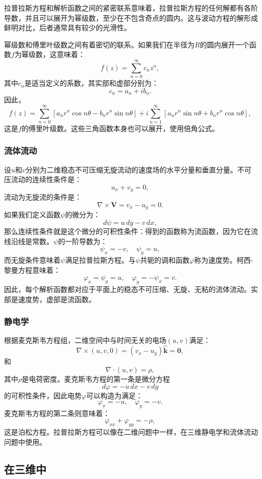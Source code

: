 拉普拉斯方程和解析函数之间的紧密联系意味着，拉普拉斯方程的任何解都有各阶导数，并且可以展开为幂级数，至少在不包含奇点的圆内。这与波动方程的解形成鲜明对比，后者通常具有较少的光滑性。

幂级数和傅里叶级数之间有着密切的联系。如果我们在半径为\( R \)的圆内展开一个函数\( f \)为幂级数，这意味着：
\[
f(z) = \sum_{n=0}^{\infty} c_n z^n,~
\]
其中\( c_n \)是适当定义的系数，其实部和虚部分别为：
\[
c_n = a_n + i b_n.~
\]
因此，
\[
f(z) = \sum_{n=0}^{\infty} \left[ a_n r^n \cos n\theta - b_n r^n \sin n\theta \right] + i \sum_{n=1}^{\infty} \left[ a_n r^n \sin n\theta + b_n r^n \cos n\theta \right],~
\]
这是\( f \)的傅里叶级数。这些三角函数本身也可以展开，使用倍角公式。
\subsubsection{流体流动}   
设\( u \)和\( v \)分别为二维稳态不可压缩无旋流动的速度场的水平分量和垂直分量。不可压流动的连续性条件是：
\[
u_x + v_y = 0,~
\]
流动为无旋流的条件是：
\[
\nabla \times \mathbf{V} = v_x - u_y = 0.~
\]
如果我们定义函数\( \psi \)的微分为：
\[
d\psi = u\, dy - v\, dx,~
\]
那么连续性条件就是这个微分的可积性条件：得到的函数称为流函数，因为它在流线沿线是常数。\( \psi \)的一阶导数为：
\[
\psi_x = -v, \quad \psi_y = u,~
\]
而无旋条件意味着\( \psi \)满足拉普拉斯方程。与\( \psi \)共轭的调和函数\( \varphi \)称为速度势。柯西-黎曼方程意味着：
\[
\varphi_x = \psi_y = u, \quad \varphi_y = -\psi_x = v.~
\]
因此，每个解析函数都对应于平面上的稳态不可压缩、无旋、无粘的流体流动。实部是速度势，虚部是流函数。
\subsubsection{静电学}  
根据麦克斯韦方程组，二维空间中与时间无关的电场\( (u, v) \)满足：
\[
\nabla \times (u, v, 0) = (v_x - u_y) \hat{\mathbf{k}} = \mathbf{0},~
\]
和
\[
\nabla \cdot (u, v) = \rho,~
\]
其中\( \rho \)是电荷密度。麦克斯韦方程的第一条是微分方程
\[
d\varphi = -u\, dx - v\, dy~
\]
的可积性条件，因此电势\( \varphi \)可以构造为满足：
\[
\varphi_x = -u, \quad \varphi_y = -v.~
\]
麦克斯韦方程的第二条则意味着：
\[
\varphi_{xx} + \varphi_{yy} = -\rho,~
\]
这是泊松方程。拉普拉斯方程可以像在二维问题中一样，在三维静电学和流体流动问题中使用。
\subsection{在三维中}  
